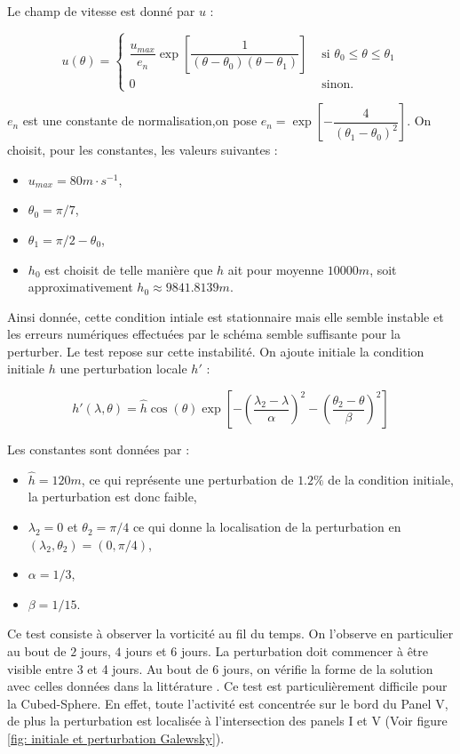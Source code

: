 Le champ de vitesse est donné par $u$ :

\begin{equation}
u(\theta) = \left\lbrace
\begin{array}{ll}
\dfrac{u_{max}}{e_n} \exp \left[ \dfrac{1}{(\theta-\theta_0)(\theta-\theta_1)} \right] & \text{ si } \theta_0 \leq \theta \leq \theta_1 \\
0 & \text{ sinon.}
\end{array}
\right.
\end{equation}

$e_n$ est une constante de normalisation,on pose $e_n = \exp\left[ - \dfrac{4}{(\theta_1-\theta_0)^2} \right]$. On choisit, pour les constantes, les valeurs suivantes :
\begin{itemize}
\item $u_{max}=80 m \cdot s^{-1}$,
\item $\theta_0 = \pi/7$,
\item $\theta_1 = \pi/2 - \theta_0$,
\item $h_0$ est choisit de telle manière que $h$ ait pour moyenne $10000 m$, soit approximativement $h_0 \approx 9841.8139 m$.
\end{itemize}

Ainsi donnée, cette condition intiale est stationnaire mais elle semble instable et les erreurs numériques effectuées par le schéma semble suffisante pour la perturber. Le test repose sur cette instabilité. On ajoute initiale la condition initiale $h$ une perturbation locale $h'$ :

\begin{equation}
h'(\lambda, \theta) = \hat{h} \cos ( \theta ) \exp \left[ - \left( \dfrac{\lambda_2 - \lambda}{\alpha} \right)^2 - \left( \dfrac{\theta_2 - \theta}{\beta} \right)^2 \right]
\end{equation}

Les constantes sont données par :
\begin{itemize}
\item $\hat{h} = 120m$, ce qui représente une perturbation de $1.2 \%$ de la condition initiale, la perturbation est donc faible,
\item $\lambda_2 = 0$ et $\theta_2 = \pi /4$ ce qui donne la localisation de la perturbation en $(\lambda_2, \theta_2) = (0, \pi/4)$,
\item $\alpha = 1/3$,
\item $\beta = 1/15$.
\end{itemize}

Ce test consiste à observer la vorticité au fil du temps. On l'observe en particulier au bout de $2$ jours, $4$ jours et $6$ jours. La perturbation doit commencer à être visible entre 3 et 4 jours. Au bout de 6 jours, on vérifie la forme de la solution avec celles données dans la littérature \cite{Galewsky2004, Chen2008}. Ce test est particulièrement difficile pour la Cubed-Sphere. En effet, toute l'activité est concentrée sur le bord du Panel V, de plus la perturbation est localisée à l'intersection des panels I et V (Voir figure \ref{fig: initiale et perturbation Galewsky}).

